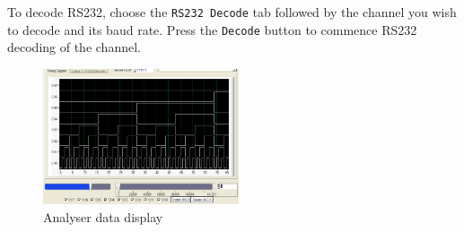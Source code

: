 \documentclass[11pt,twocolumn]{article}
\begin{document}
    To decode RS232, choose the \texttt{RS232 Decode} tab followed by the
    channel you wish to decode and its baud rate. Press the \texttt{Decode}
    button to commence RS232 decoding of the channel.

    \begin{figure}
    \centering
    \includegraphics[height=4cm]{ui-timing}
    \caption{Analyser data display}
    \label{fig:ui-timing}
    \end{figure}
	
\end{document}
